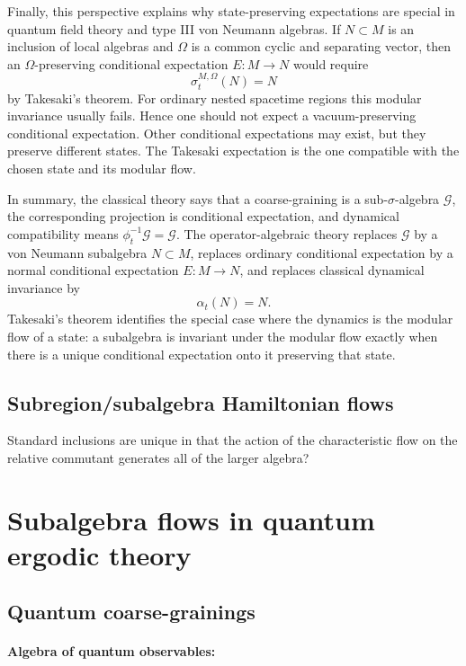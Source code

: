 \documentclass[a4paper,11pt]{article}
\theoremstyle{definition}
\begin{document}
Finally, this perspective explains why state-preserving expectations are special in quantum field theory and type III von Neumann algebras. If \(N\subset M\) is an inclusion of local algebras and \(\Omega\) is a common cyclic and separating vector, then an \(\Omega\)-preserving conditional expectation \(E:M\to N\) would require
\[
\sigma_t^{M,\Omega}(N)=N
\]
by Takesaki's theorem. For ordinary nested spacetime regions this modular invariance usually fails. Hence one should not expect a vacuum-preserving conditional expectation. Other conditional expectations may exist, but they preserve different states. The Takesaki expectation is the one compatible with the chosen state and its modular flow.

In summary, the classical theory says that a coarse-graining is a sub-\(\sigma\)-algebra \(\mathcal G\), the corresponding projection is conditional expectation, and dynamical compatibility means \(\phi_t^{-1}\mathcal G=\mathcal G\). The operator-algebraic theory replaces \(\mathcal G\) by a von Neumann subalgebra \(N\subset M\), replaces ordinary conditional expectation by a normal conditional expectation \(E:M\to N\), and replaces classical dynamical invariance by
\[
\alpha_t(N)=N.
\]
Takesaki's theorem identifies the special case where the dynamics is the modular flow of a state: a subalgebra is invariant under the modular flow exactly when there is a unique conditional expectation onto it preserving that state.


\subsection{Subregion/subalgebra Hamiltonian flows}

Standard inclusions are unique in that the action of the characteristic flow on the relative commutant generates all of the larger algebra?

\section{Subalgebra flows in quantum ergodic theory}\label{section:basics}

\subsection{Quantum coarse-grainings}

\paragraph{Algebra of quantum observables:}
\end{document}
